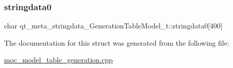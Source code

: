 \subsubsection{\texorpdfstring{stringdata0}{stringdata0}}
{\footnotesize\ttfamily char qt\+\_\+meta\+\_\+stringdata\+\_\+\+Generation\+Table\+Model\+\_\+t\+::stringdata0\mbox{[}400\mbox{]}}



The documentation for this struct was generated from the following file\+:\begin{DoxyCompactItemize}
\item 
\hyperlink{moc__model__table__generation_8cpp}{moc\+\_\+model\+\_\+table\+\_\+generation.\+cpp}\end{DoxyCompactItemize}
